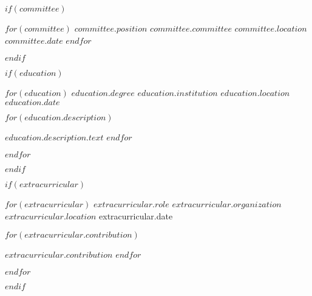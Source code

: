 \documentclass[11pt, a4paper]{awesome-cv}
\begin{document}

    $if(committee)$

    \begin{cvhonors}
        $for(committee)$
        \cvhonor
        {$committee.position$} %
        {$committee.committee$} %
        {$committee.location$} %
        {$committee.date$} %
        {}
        $endfor$
    \end{cvhonors}
    $endif$


    $if(education)$

    \begin{cventries}
        $for(education)$
        \cventry
        {$education.degree$} %
        {$education.institution$} %
        {$education.location$} %
        {$education.date$} %
        {
        \begin{cvitems}
            $for(education.description)$
            \item {$education.description.text$}
            $endfor$
        \end{cvitems}
        }
        $endfor$
    \end{cventries}
    $endif$


    $if(extracurricular)$

    \begin{cventries}
        $for(extracurricular)$
        \cventry
        {$extracurricular.role$} %
        {$extracurricular.organization$} %
        {$extracurricular.location$} %
        {extracurricular.date} %
        {
        \begin{cvitems}
            $for(extracurricular.contribution)$
            \item {$extracurricular.contribution$}
            $endfor$
        \end{cvitems}
        }
        $endfor$
    \end{cventries}
    $endif$
\end{document}
